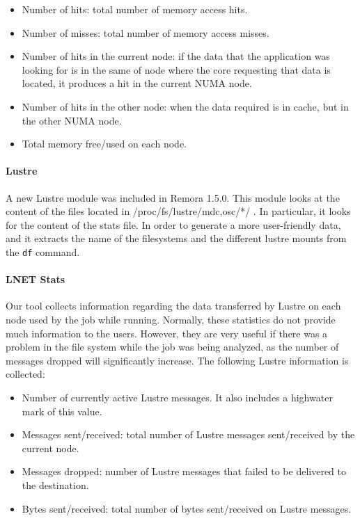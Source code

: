 \documentclass[10pt,a4paper]{report}
\begin{document}
\begin{itemize}
	\item Number of hits: total number of memory access hits. 
	\item Number of misses: total number of memory access misses. 
	\item Number of hits in the current node: if the data that the application was looking for is in the same of node where the core requesting that data is located, it produces a hit in the current NUMA node.
	\item Number of hits in the other node: when the data required is in cache, but in the other NUMA node.
	\item Total memory free/used on each node.
\end{itemize}


\paragraph{Lustre} 

A new Lustre module was included in Remora 1.5.0. This module looks at the content of the files located in /proc/fs/lustre/{mdc,osc}/*/ . In particular, it looks for the content of the stats file. In order to generate a more user-friendly data, and it extracts the name of the filesystems and the different lustre mounts from the \texttt{df} command.



\paragraph{LNET Stats}
Our tool collects information regarding the data transferred by Lustre on each node used by the job while running. Normally, these statistics do not provide much information to the users. However, they are very useful if there was a problem in the file system while the job was being analyzed, as the number of messages dropped will significantly increase. The following Lustre information is collected:

\begin{itemize}
\item Number of currently active Lustre messages. It also includes a highwater mark of this value.
\item Messages sent/received: total number of Lustre messages sent/received by the current node.
\item Messages dropped: number of Lustre messages that failed to be delivered to the destination.
\item Bytes sent/received: total number of bytes sent/received on Lustre messages.
\end{itemize}
\end{document}
